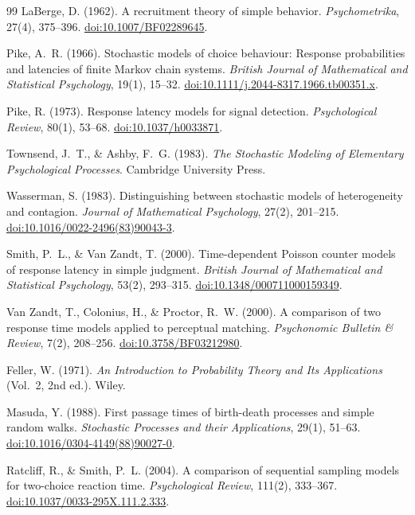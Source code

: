 \documentclass[12pt]{article}
\theoremstyle{definition}
\theoremstyle{plain}
\theoremstyle{remark}
\begin{document}
\begin{thebibliography}{99}
LaBerge, D. (1962). A recruitment theory of simple behavior. \emph{Psychometrika}, 27(4), 375--396. \href{https://doi.org/10.1007/BF02289645}{doi:10.1007/BF02289645}.

Pike, A.~R. (1966). Stochastic models of choice behaviour: Response probabilities and latencies of finite Markov chain systems. \emph{British Journal of Mathematical and Statistical Psychology}, 19(1), 15--32. \href{https://doi.org/10.1111/j.2044-8317.1966.tb00351.x}{doi:10.1111/j.2044-8317.1966.tb00351.x}.

Pike, R. (1973). Response latency models for signal detection. \emph{Psychological Review}, 80(1), 53--68. \href{https://doi.org/10.1037/h0033871}{doi:10.1037/h0033871}.

Townsend, J.~T., \& Ashby, F.~G. (1983). \emph{The Stochastic Modeling of Elementary Psychological Processes}. Cambridge University Press.

Wasserman, S. (1983). Distinguishing between stochastic models of heterogeneity and contagion. \emph{Journal of Mathematical Psychology}, 27(2), 201--215. \href{https://doi.org/10.1016/0022-2496(83)90043-3}{doi:10.1016/0022-2496(83)90043-3}.

Smith, P.~L., \& Van Zandt, T. (2000). Time-dependent Poisson counter models of response latency in simple judgment. \emph{British Journal of Mathematical and Statistical Psychology}, 53(2), 293--315. \href{https://doi.org/10.1348/000711000159349}{doi:10.1348/000711000159349}.

Van Zandt, T., Colonius, H., \& Proctor, R.~W. (2000). A comparison of two response time models applied to perceptual matching. \emph{Psychonomic Bulletin \& Review}, 7(2), 208--256. \href{https://doi.org/10.3758/BF03212980}{doi:10.3758/BF03212980}.

Feller, W. (1971). \emph{An Introduction to Probability Theory and Its Applications} (Vol.~2, 2nd ed.). Wiley.

Masuda, Y. (1988). First passage times of birth-death processes and simple random walks. \emph{Stochastic Processes and their Applications}, 29(1), 51--63. \href{https://doi.org/10.1016/0304-4149(88)90027-0}{doi:10.1016/0304-4149(88)90027-0}.

Ratcliff, R., \& Smith, P.~L. (2004). A comparison of sequential sampling models for two-choice reaction time. \emph{Psychological Review}, 111(2), 333--367. \href{https://doi.org/10.1037/0033-295X.111.2.333}{doi:10.1037/0033-295X.111.2.333}.
\end{thebibliography}
\end{document}

